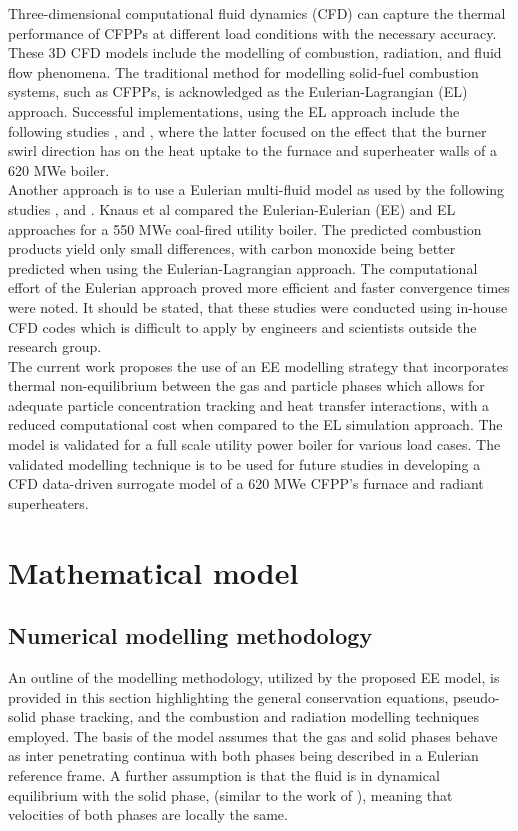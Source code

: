 \documentclass{webofc}
\begin{document}
Three-dimensional computational fluid dynamics (CFD) can capture the thermal performance of CFPPs at different load conditions with the necessary accuracy. These 3D CFD models include the modelling of combustion, radiation, and fluid flow phenomena. The traditional method for modelling
solid-fuel combustion systems, such as CFPPs, is acknowledged as the Eulerian-Lagrangian (EL) approach. Successful implementations, using the EL approach include the following studies \cite{bohnstein},\cite{laubscher_1} and \cite{laubscher_2}, where the latter focused on the effect that the burner swirl direction has on the heat uptake to the furnace and superheater walls of a 620 MWe boiler.\\

Another approach is to use a Eulerian multi-fluid model as used by the following studies \cite{epple}, \cite{cai} and \cite{wu}. Knaus et al \cite{knaus} compared the Eulerian-Eulerian (EE) and EL approaches for a 550 MWe coal-fired utility boiler. The predicted combustion products yield only small differences, with carbon monoxide being better predicted when using the Eulerian-Lagrangian approach. The computational effort of the Eulerian approach proved more efficient and faster convergence times were noted. It should be stated, that these studies were conducted using in-house CFD codes which is difficult to apply by engineers and scientists outside the research group.\\

The current work proposes the use of an EE modelling strategy that incorporates thermal non-equilibrium between the gas and particle phases which allows for adequate particle concentration tracking and heat transfer interactions, with a reduced computational cost when compared to the EL simulation approach. The model is validated for a full scale utility power boiler for various load cases. The validated modelling technique is to be used for future studies in developing a CFD data-driven surrogate model of a 620 MWe CFPP's furnace and radiant superheaters. 

\section{Mathematical model} \label{Theory}
\subsection{Numerical modelling methodology}
An outline of the modelling methodology, utilized by the proposed EE model, is provided in this section highlighting the general conservation equations, pseudo-solid phase tracking, and the combustion and radiation modelling techniques employed. The basis of the model assumes that the gas and solid phases behave as inter penetrating continua with both phases being described in a Eulerian reference frame. A further assumption is that the fluid is in dynamical equilibrium with the solid phase, (similar to the work of \cite{epple}), meaning that velocities of both phases are locally the same.
\end{document}

